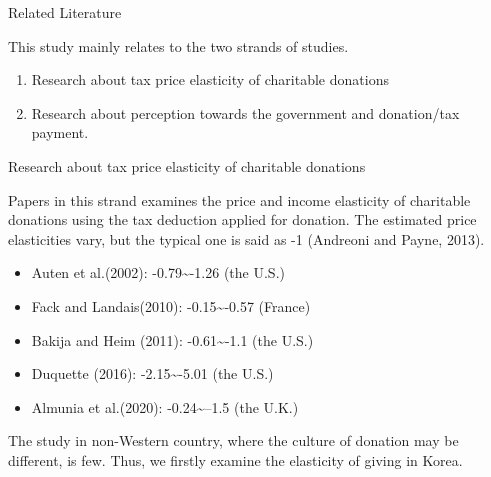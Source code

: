 \documentclass[
  ignorenonframetext,
]{beamer}
\providecommand{\tightlist}{%
  \setlength{\itemsep}{0pt}\setlength{\parskip}{0pt}}
\begin{document}
\begin{frame}{Related Literature}
\protect\hypertarget{related-literature}{}

This study mainly relates to the two strands of studies.

\begin{enumerate}
\tightlist
\item
  Research about tax price elasticity of charitable donations
\item
  Research about perception towards the government and donation/tax
  payment.
\end{enumerate}

\end{frame}

\begin{frame}{Research about tax price elasticity of charitable
donations}
\protect\hypertarget{research-about-tax-price-elasticity-of-charitable-donations}{}

Papers in this strand examines the price and income elasticity of
charitable donations using the tax deduction applied for donation. The
estimated price elasticities vary, but the typical one is said as -1
(Andreoni and Payne, 2013).

\begin{itemize}
\tightlist
\item
  Auten et al.(2002): -0.79\textasciitilde-1.26 (the U.S.)
\item
  Fack and Landais(2010): -0.15\textasciitilde-0.57 (France)
\item
  Bakija and Heim (2011): -0.61\textasciitilde-1.1 (the U.S.)
\item
  Duquette (2016): -2.15\textasciitilde-5.01 (the U.S.)
\item
  Almunia et al.(2020): -0.24\textasciitilde--1.5 (the U.K.)
\end{itemize}

The study in non-Western country, where the culture of donation may be
different, is few. Thus, we firstly examine the elasticity of giving in
Korea.

\end{frame}
\end{document}

